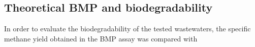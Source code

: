 \subsection{Theoretical BMP and biodegradability}
In order to evaluate the biodegradability of the tested wastewaters, the specific methane yield obtained in the BMP assay was compared with 
